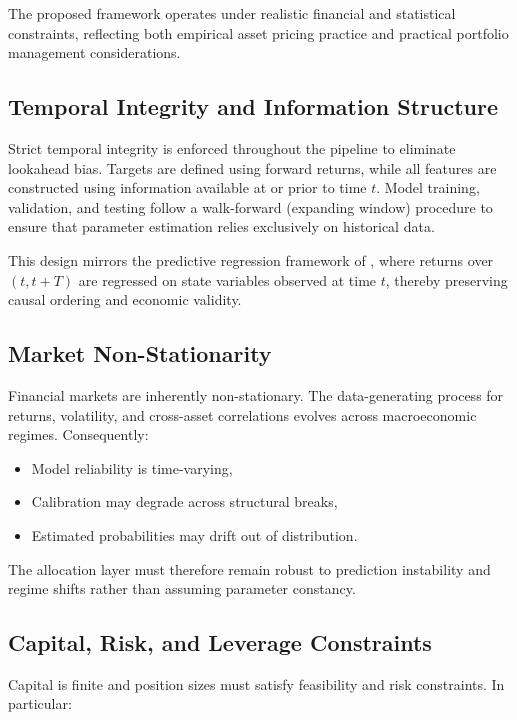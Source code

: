 \documentclass{l4proj}
\begin{document}
The proposed framework operates under realistic financial and statistical constraints, reflecting both empirical asset pricing practice and practical portfolio management considerations.

\subsection{Temporal Integrity and Information Structure}

Strict temporal integrity is enforced throughout the pipeline to eliminate lookahead bias. Targets are defined using forward returns, while all features are constructed using information available at or prior to time $t$. Model training, validation, and testing follow a walk-forward (expanding window) procedure to ensure that parameter estimation relies exclusively on historical data.

This design mirrors the predictive regression framework of \cite{FAMA19883}, where returns over $(t, t+T)$ are regressed on state variables observed at time $t$, thereby preserving causal ordering and economic validity.

\subsection{Market Non-Stationarity}

Financial markets are inherently non-stationary. The data-generating process for returns, volatility, and cross-asset correlations evolves across macroeconomic regimes. Consequently:

\begin{itemize}
    \item Model reliability is time-varying,
    \item Calibration may degrade across structural breaks,
    \item Estimated probabilities may drift out of distribution.
\end{itemize}

The allocation layer must therefore remain robust to prediction instability and regime shifts rather than assuming parameter constancy.

\subsection{Capital, Risk, and Leverage Constraints}

Capital is finite and position sizes must satisfy feasibility and risk constraints. In particular:
\end{document}
